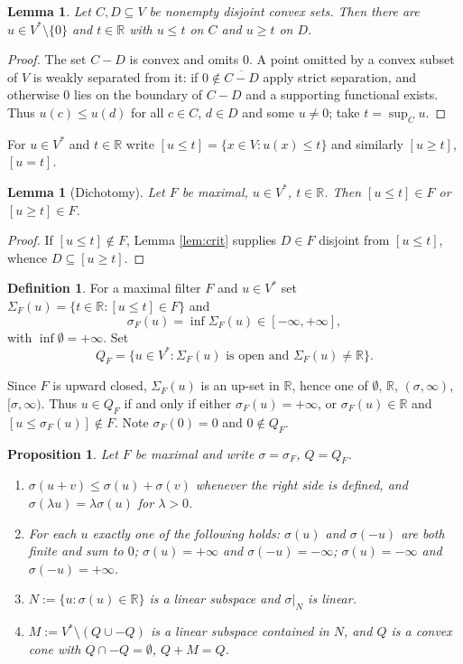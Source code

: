 \documentclass[11pt]{amsart}
\theoremstyle{plain}
\newtheorem{proposition}[theorem]{Proposition}
\newtheorem{lemma}[theorem]{Lemma}
\theoremstyle{definition}
\newtheorem{definition}[theorem]{Definition}
\newcommand{\RR}{\mathbb{R}}
\newcommand{\Vs}{V^{*}}
\begin{document}
\begin{lemma}\label{lem:sep}
Let $C,D\subseteq V$ be nonempty disjoint convex sets. Then there are $u\in\Vs\setminus\{0\}$ and $t\in\RR$ with $u\le t$ on $C$ and $u\ge t$ on $D$.
\end{lemma}

\begin{proof}
The set $C-D$ is convex and omits $0$. A point omitted by a convex subset of $V$ is weakly separated from it: if $0\notin\overline{C-D}$ apply strict separation, and otherwise $0$ lies on the boundary of $C-D$ and a supporting functional exists. Thus $u(c)\le u(d)$ for all $c\in C$, $d\in D$ and some $u\neq0$; take $t=\sup_{C}u$.
\end{proof}

For $u\in\Vs$ and $t\in\RR$ write $[u\le t]=\{x\in V:u(x)\le t\}$ and similarly $[u\ge t]$, $[u=t]$.

\begin{lemma}[Dichotomy]\label{lem:dich}
Let $F$ be maximal, $u\in\Vs$, $t\in\RR$. Then $[u\le t]\in F$ or $[u\ge t]\in F$.
\end{lemma}

\begin{proof}
If $[u\le t]\notin F$, Lemma \ref{lem:crit} supplies $D\in F$ disjoint from $[u\le t]$, whence $D\subseteq[u\ge t]$.
\end{proof}

\begin{definition}
For a maximal filter $F$ and $u\in\Vs$ set $\Sigma_F(u)=\{t\in\RR:[u\le t]\in F\}$ and
\[
\sigma_F(u)=\inf\Sigma_F(u)\in[-\infty,+\infty],
\]
with $\inf\emptyset=+\infty$. Set
\[
Q_F=\{u\in\Vs:\Sigma_F(u)\text{ is open and }\Sigma_F(u)\neq\RR\}.
\]
\end{definition}

Since $F$ is upward closed, $\Sigma_F(u)$ is an up-set in $\RR$, hence one of $\emptyset$, $\RR$, $(\sigma,\infty)$, $[\sigma,\infty)$. Thus $u\in Q_F$ if and only if either $\sigma_F(u)=+\infty$, or $\sigma_F(u)\in\RR$ and $[u\le\sigma_F(u)]\notin F$. Note $\sigma_F(0)=0$ and $0\notin Q_F$.

\begin{proposition}\label{prop:sigma}
Let $F$ be maximal and write $\sigma=\sigma_F$, $Q=Q_F$.
\begin{enumerate}
\item\label{it:sub} $\sigma(u+v)\le\sigma(u)+\sigma(v)$ whenever the right side is defined, and $\sigma(\lambda u)=\lambda\sigma(u)$ for $\lambda>0$.
\item\label{it:tri} For each $u$ exactly one of the following holds: $\sigma(u)$ and $\sigma(-u)$ are both finite and sum to $0$; $\sigma(u)=+\infty$ and $\sigma(-u)=-\infty$; $\sigma(u)=-\infty$ and $\sigma(-u)=+\infty$.
\item\label{it:N} $N:=\{u:\sigma(u)\in\RR\}$ is a linear subspace and $\sigma|_N$ is linear.
\item\label{it:M} $M:=\Vs\setminus(Q\cup-Q)$ is a linear subspace contained in $N$, and $Q$ is a convex cone with $Q\cap-Q=\emptyset$, $Q+M=Q$.
\end{enumerate}
\end{proposition}
\end{document}

